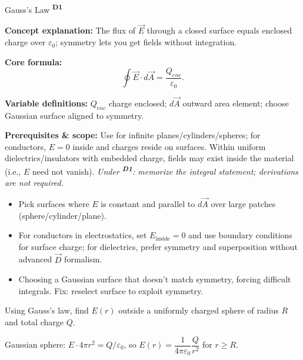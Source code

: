 ﻿\documentclass[12pt,a4paper]{article}
\providecommand{\KPFormulas}{}
\providecommand{\KPHeuristics}{}
\providecommand{\KPProblems}{}
\newcommand{\DOne}{\texorpdfstring{\textsuperscript{\textbf{D1}}}{ D1}}
\begin{document}
\begin{KnowledgePoint}{Gauss's Law \DOne}
  \KPFormulas
  \begin{formulabox}
  \textbf{Concept explanation:} The flux of $\vec E$ through a closed surface equals enclosed charge over $\varepsilon_0$; symmetry lets you get fields without integration.

  \textbf{Core formula:}
  \[
  \oint \vec E\cdot d\vec A=\frac{Q_{enc}}{\varepsilon_0}.
  \]

  \textbf{Variable definitions:} $Q_{enc}$ charge enclosed; $d\vec A$ outward area element; choose Gaussian surface aligned to symmetry.

  

  \textbf{Prerequisites \& scope:} Use for infinite planes/cylinders/spheres; for conductors, $E=0$ inside and charges reside on surfaces. Within uniform dielectrics/insulators with embedded charge, fields may exist inside the material (i.e., $E$ need not vanish). \textit{Under \DOne: memorize the integral statement; derivations are not required.}
  \end{formulabox}

  \KPHeuristics
  \begin{heuristicsbox}
  \begin{itemize}[leftmargin=*]
    \item Pick surfaces where $E$ is constant and parallel to $d\vec A$ over large patches (sphere/cylinder/plane).
    \item For conductors in electrostatics, set $E_{\text{inside}}=0$ and use boundary conditions for surface charge; for dielectrics, prefer symmetry and superposition without advanced $\vec D$ formalism.
  \end{itemize}
  \vspace{0.4em}
  \begin{itemize}[leftmargin=*]
    \item Choosing a Gaussian surface that doesn't match symmetry, forcing difficult integrals. Fix: reselect surface to exploit symmetry.
  \end{itemize}
  \end{heuristicsbox}

  \KPProblems
\begin{cheatproblem}
  Using Gauss's law, find $E(r)$ outside a uniformly charged sphere of radius $R$ and total charge $Q$.
  \begin{solutionbox}
  Gaussian sphere: $E\cdot4\pi r^2=Q/\varepsilon_0$, so $E(r)=\dfrac{1}{4\pi\varepsilon_0}\dfrac{Q}{r^2}$ for $r\ge R$.
  \end{solutionbox}
  \end{cheatproblem}
\end{KnowledgePoint}
\end{document}
